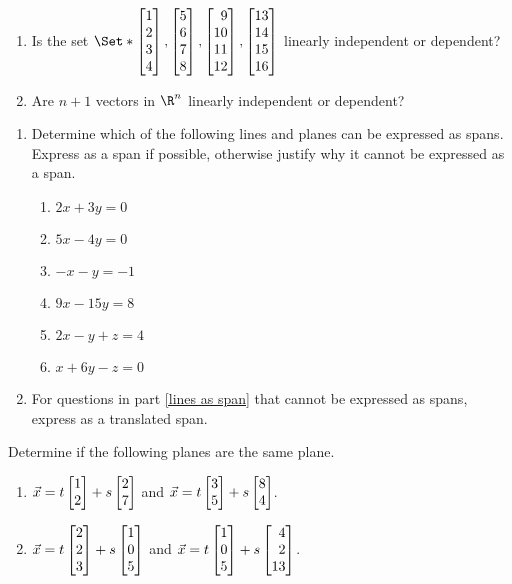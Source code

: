\begin{exercises}
\begin{problist}
\begin{enumerate}
			\item Is the set $\Set*{\mat{1\\2\\3\\4},\mat{5\\6\\7\\8},
			\mat{9\\10\\11\\12}, \mat{13\\14\\15\\16}}$ linearly independent or dependent?

			\item Are $n+1$ vectors in $\R^n$ linearly independent or dependent?
		\end{enumerate}
		\prob
		\begin{enumerate}
			\item
			Determine which of the following lines and planes can be expressed as spans.
			Express as a span if possible, otherwise justify why it cannot be expressed as a span.
			\label{lines as span}
			\begin{enumerate}
				\item $2x+3y=0$
				\item $5x-4y=0$
				\item $-x-y=-1$
				\item $9x-15y=8$
				\item $2x-y+z=4$
				\item	$x+6y-z=0$
			\end{enumerate}
			\item
			For questions in part \ref{lines as span} that cannot be expressed as spans, express
			as a translated span.
		\end{enumerate}
		\prob
		Determine if the following planes are the same plane.
		\begin{enumerate}
			\item $\vec x = t\mat{1\\2} + s\mat{2\\7}$ and
						$\vec x = t\mat{3\\5} + s\mat{8\\4}$.
			\item $\vec x = t\mat{2\\2\\3} + s\mat{1\\0\\5}$ and
						$\vec x = t\mat{1\\0\\5} + s\mat{4\\2\\13}$.

\end{enumerate}
\end{problist}
\end{exercises}
